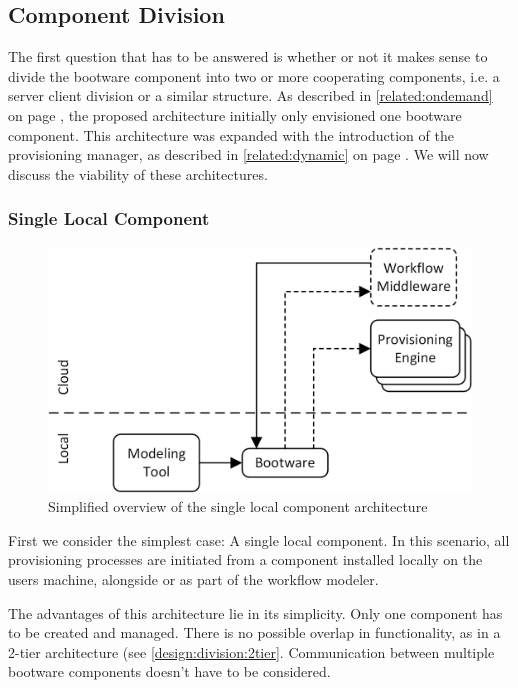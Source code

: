 \subsection{Component Division}

The first question that has to be answered is whether or not it makes sense to divide the bootware component into two or more cooperating components, i.e. a server client division or a similar structure.
As described in \autoref{related:ondemand} on page \pageref{related:ondemand}, the proposed architecture initially only envisioned one bootware component.
This architecture was expanded with the introduction of the provisioning manager, as described in \autoref{related:dynamic} on page \pageref{related:dynamic}.
We will now discuss the viability of these architectures.

\subsubsection{Single Local Component}

\begin{figure}[!htbp]
	\centering
	\includegraphics[resolution=600]{design/assets/simple_local}
	\caption{Simplified overview of the single local component architecture}
	\label{image:single_local}
\end{figure}

First we consider the simplest case: A single local component.
In this scenario, all provisioning processes are initiated from a component installed locally on the users machine, alongside or as part of the workflow modeler.

The advantages of this architecture lie in its simplicity.
Only one component has to be created and managed.
There is no possible overlap in functionality, as in a 2-tier architecture (see \autoref{design:division:2tier}.
Communication between multiple bootware components doesn't have to be considered.

